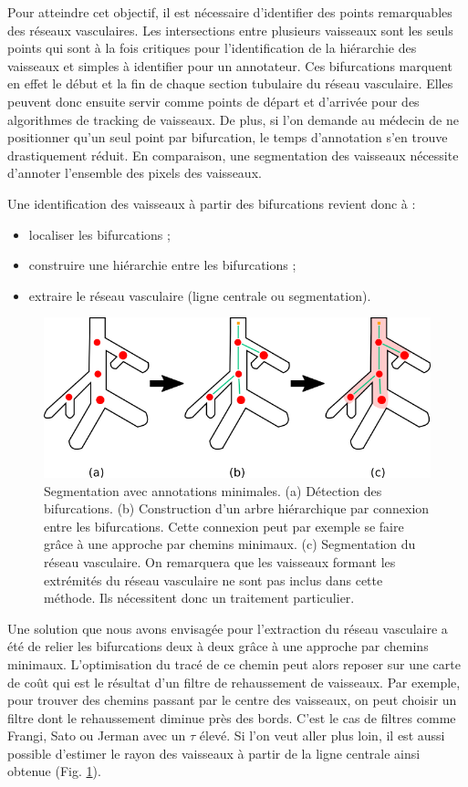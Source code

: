 Pour atteindre cet objectif, il est nécessaire d'identifier des points remarquables des réseaux vasculaires. Les intersections entre plusieurs vaisseaux sont les seuls points qui sont à la fois critiques pour l'identification de la hiérarchie des vaisseaux et simples à identifier pour un annotateur. Ces bifurcations marquent en effet le début et la fin de chaque section tubulaire du réseau vasculaire. Elles peuvent donc ensuite servir comme points de départ et d'arrivée pour des algorithmes de tracking de vaisseaux.  De plus, si l'on demande au médecin de ne positionner qu'un seul point par bifurcation, le temps d'annotation s'en trouve drastiquement réduit. En comparaison, une segmentation des vaisseaux nécessite d'annoter l'ensemble des pixels des vaisseaux.
 
Une identification des vaisseaux à partir des bifurcations revient donc à :

\begin{itemize}
\item localiser les bifurcations ;
\item construire une hiérarchie entre les bifurcations ;
\item extraire le réseau vasculaire (ligne centrale ou segmentation).
\end{itemize}
\begin{figure}[!ht]
    \centering
    \includegraphics[width=\textwidth]{Images/thrifty_annotations.png}
    \caption{Segmentation avec annotations minimales. (a) Détection des bifurcations. (b) Construction d'un arbre hiérarchique par connexion entre les bifurcations. Cette connexion peut par exemple se faire grâce à une approche par chemins minimaux. (c) Segmentation du réseau vasculaire. On remarquera que les vaisseaux formant les extrémités du réseau vasculaire ne sont pas inclus dans cette méthode. Ils nécessitent donc un traitement particulier.}
    \label{fig:thrifty}
  \end{figure}

Une solution que nous avons envisagée pour l'extraction du réseau vasculaire a été de relier les bifurcations deux à deux grâce à une approche par chemins minimaux. L'optimisation du tracé de ce chemin peut alors reposer sur une carte de coût qui est le résultat d'un filtre de rehaussement de vaisseaux. Par exemple, pour trouver des chemins passant par le centre des vaisseaux, on peut choisir un filtre dont le rehaussement diminue près des bords. C'est le cas de filtres comme Frangi, Sato ou Jerman avec un $\tau$ élevé. Si l'on veut aller plus loin, il est aussi possible d'estimer le rayon des vaisseaux à partir de la ligne centrale ainsi obtenue (Fig. \ref{fig:thrifty}).

